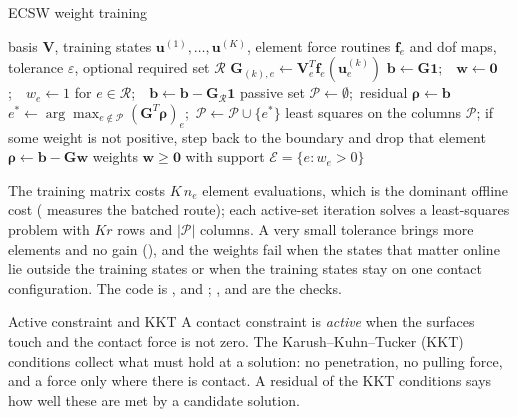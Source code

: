 \begin{algbox}{ECSW weight training}
\begin{pseudo}
\Require basis $\bm V$, training states $\bm u^{(1)},\dots,\bm u^{(K)}$, element force routines $\bm f_e$ and dof maps, tolerance $\varepsilon$, optional required set $\mathcal R$
 
    \State $\bm G_{(k),e}\gets\bm V_e^T\bm f_e(\bm u^{(k)}_e)$
  \EndFor
\EndFor
\State $\bm b\gets\bm G\bm 1$;\ \ $\bm w\gets\bm 0$;\ \ $w_e\gets1$ for $e\in\mathcal R$;\ \ $\bm b\gets\bm b-\bm G_{\mathcal R}\bm 1$
\State passive set $\mathcal P\gets\emptyset$;\ residual $\bm\rho\gets\bm b$
  \State $e^\ast\gets\arg\max_{e\notin\mathcal P}(\bm G^T\bm\rho)_e$;\ $\mathcal P\gets\mathcal P\cup\{e^\ast\}$
  \State least squares on the columns $\mathcal P$; if some weight is not positive, step back to the boundary and drop that element 
  \State $\bm\rho\gets\bm b-\bm G\bm w$
\EndWhile
\Ensure weights $\bm w\ge\bm 0$ with support $\mathcal E=\{e:w_e>0\}$
\end{pseudo}
\end{algbox}

The training matrix costs $K\,n_e$ element evaluations, which is the dominant offline cost ( measures the batched route); each active-set iteration solves a least-squares problem with $Kr$ rows and $|\mathcal P|$ columns. A very small tolerance brings more elements and no gain (), and the weights fail when the states that matter online lie outside the training states or when the training states stay on one contact configuration. The code is ,  and ; ,  and  are the checks.


\begin{sidenote}{Active constraint and KKT}
A contact constraint is \emph{active} when the surfaces touch and the contact force is not zero. The Karush--Kuhn--Tucker (KKT) conditions collect what must hold at a solution: no penetration, no pulling force, and a force only where there is contact. A residual of the KKT conditions says how well these are met by a candidate solution.
\end{sidenote}

